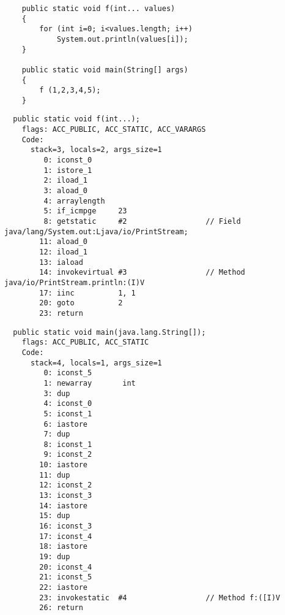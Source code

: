 \subsubsection{}


\begin{lstlisting}
	public static void f(int... values)
	{
		for (int i=0; i<values.length; i++)
			System.out.println(values[i]);
	}

	public static void main(String[] args) 
	{
		f (1,2,3,4,5);
	}
\end{lstlisting}

\begin{lstlisting}
  public static void f(int...);
    flags: ACC_PUBLIC, ACC_STATIC, ACC_VARARGS
    Code:
      stack=3, locals=2, args_size=1
         0: iconst_0      
         1: istore_1      
         2: iload_1       
         3: aload_0       
         4: arraylength   
         5: if_icmpge     23
         8: getstatic     #2                  // Field java/lang/System.out:Ljava/io/PrintStream;
        11: aload_0       
        12: iload_1       
        13: iaload        
        14: invokevirtual #3                  // Method java/io/PrintStream.println:(I)V
        17: iinc          1, 1
        20: goto          2
        23: return        
\end{lstlisting}


\begin{lstlisting}
  public static void main(java.lang.String[]);
    flags: ACC_PUBLIC, ACC_STATIC
    Code:
      stack=4, locals=1, args_size=1
         0: iconst_5      
         1: newarray       int
         3: dup           
         4: iconst_0      
         5: iconst_1      
         6: iastore       
         7: dup           
         8: iconst_1      
         9: iconst_2      
        10: iastore       
        11: dup           
        12: iconst_2      
        13: iconst_3      
        14: iastore       
        15: dup           
        16: iconst_3      
        17: iconst_4      
        18: iastore       
        19: dup           
        20: iconst_4      
        21: iconst_5      
        22: iastore       
        23: invokestatic  #4                  // Method f:([I)V
        26: return        
\end{lstlisting}

